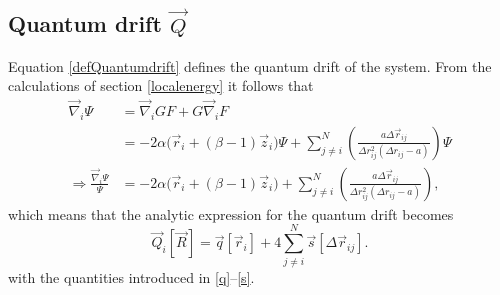 \documentclass[a4paper,8pt]{article}
\begin{document}
\subsection{Quantum drift $\vec{Q}$} \label{quantumdrift}
Equation \eqref{defQuantumdrift} defines the quantum drift of the system. From the calculations of section \ref{localenergy} it follows that
\begin{align}
\vec{\nabla}_i\Psi &= \vec{\nabla}_i G F + G \vec{\nabla}_i F \nonumber\\
&= -2\alpha\Big(\vec{r}_i+(\beta-1)\vec{z}_i\Big)\Psi + \sum\limits_{j \neq i}^N \left(\frac{a\Delta\vec{r}_{ij}}{\Delta{r}_{ij}^2(\Delta{r}_{ij}-a)}\right) \Psi \nonumber\\
\Longrightarrow \frac{\vec{\nabla}_i\Psi}{\Psi} &= -2\alpha\Big(\vec{r}_i+(\beta-1)\vec{z}_i\Big) + \sum\limits_{j \neq i}^N \left(\frac{a\Delta\vec{r}_{ij}}{\Delta{r}_{ij}^2(\Delta{r}_{ij}-a)}\right),
\end{align}
which means that the analytic expression for the quantum drift becomes
\begin{equation}
\vec{Q}_i[\vec{R}] = \vec{q}[\vec{r}_i] + 4\sum\limits_{j \neq i}^N \vec{s}[\Delta\vec{r}_{ij}].
\end{equation}
with the quantities introduced in \eqref{q}–\eqref{s}.
\end{document}
